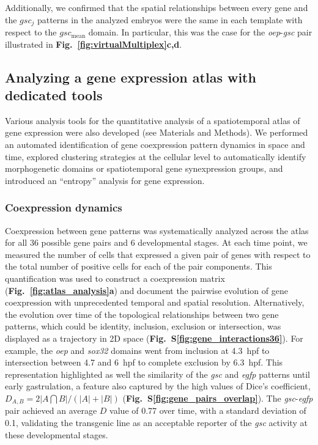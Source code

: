 Additionally, we confirmed that the spatial relationships between every gene and the $gsc_j$ patterns in the analyzed embryos were the same in each template with respect to the $gsc_\mathrm{mean}$ domain. In particular, this was the case for the \emph{oep}-\emph{gsc} pair illustrated in \textbf{Fig.~\ref{fig:virtualMultiplex}c,d}.

\subsection*{Analyzing a gene expression atlas with dedicated tools}
\label{subsec:BiologicalInsights}

Various analysis tools for the quantitative analysis of a spatiotemporal atlas of gene expression were also developed (see Materials and Methods). We performed an automated identification of gene coexpression pattern dynamics in space and time, explored clustering strategies at the cellular level to automatically identify morphogenetic domains or spatiotemporal gene synexpression groups, and introduced an ``entropy'' analysis for gene expression.

\subsubsection*{Coexpression dynamics}

Coexpression between gene patterns was systematically analyzed across the atlas for all 36 possible gene pairs and 6 developmental stages. At each time point, we measured the number of cells that expressed a given pair of genes with respect to the total number of positive cells for each of the pair components. This quantification was used to construct a coexpression matrix (\textbf{Fig.~\ref{fig:atlas_analysis}a}) and document the pairwise evolution of gene coexpression with unprecedented temporal and spatial resolution. Alternatively, the evolution over time of the topological relationships between two gene patterns, which could be identity, inclusion, exclusion or intersection, was displayed as a trajectory in 2D space (\textbf{Fig.~S\ref{fig:gene_interactions36}}). For example, the \emph{oep} and \emph{sox32} domains went from inclusion at 4.3~hpf to intersection between 4.7 and 6~hpf to complete exclusion by 6.3~hpf. This representation highlighted as well the similarity of the \emph{gsc} and \emph{egfp} patterns until early gastrulation, a feature also captured by the high values of Dice's coefficient, $D_{A,B}=2|A\bigcap B|/(|A|+|B|)$ (\textbf{Fig.~S\ref{fig:gene_pairs_overlap}}). The \emph{gsc}-\emph{egfp} pair achieved an average $D$ value of 0.77 over time, with a standard deviation of 0.1, validating the transgenic line as an acceptable reporter of the \emph{gsc} activity at these developmental stages.


